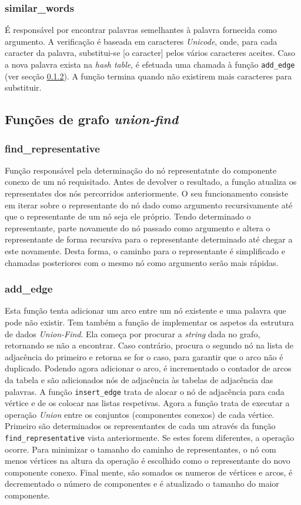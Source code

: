 \documentclass[portuguese,11pt,a4paper,titlepage]{article}
\newcommand{\foreign}[1]{\textit{#1}}
\begin{document}
\subsubsection{similar\_words}
É responsável por encontrar palavras semelhantes à palavra fornecida como argumento. A verificação é baseada em caracteres \textit{Unicode}, onde, para cada caracter da palavra, substitui-se [o caracter] pelos vários caracteres aceites. Caso a nova palavra exista na \foreign{hash table}, é efetuada uma chamada à função \verb|add_edge| (ver secção \ref{sssec:addedge}). A função termina quando não existirem mais caracteres para substituir.

\subsection{Funções de grafo \foreign{union-find}}

\subsubsection{find\_representative}
Função responsável pela determinação do nó representatnte do componente conexo de um
nó requisitado. Antes de devolver o resultado, a função atualiza os representates dos 
nós percorridos anteriormente. O seu funcionamento consiste em iterar sobre
o representante do nó dado como argumento recursivamente até que o representante de um nó seja ele próprio.
Tendo determinado o representante, parte novamente do nó passado como argumento e altera
o representante de forma recursiva para o representante determinado até chegar a este novamente. Desta forma, o caminho para o representante é simplificado e chamadas posteriores
com o mesmo nó como argumento serão mais rápidas.

\subsubsection{add\_edge}\label{sssec:addedge}
Esta função tenta adicionar um arco entre um nó existente e uma palavra que pode não
existir. Tem também a função de implementar os aspetos da estrutura de dados
\foreign{Union-Find}. Ela começa por procurar a \foreign{string} dada no grafo,
retornando se não
a encontrar. Caso contrário, procura o segundo nó na lista de adjacência do primeiro e
retorna se for o caso, para garantir que o arco não é duplicado. Podendo agora adicionar
o arco, é incrementado o contador de arcos da tabela e são adicionados nós de adjacência
às tabelas de adjacência das palavras. A função \verb|insert_edge| trata de alocar o nó
de adjacência para cada vértice e de os colocar nas listas respetivas. Agora a função
trata de executar a operação \foreign{Union} entre os conjuntos (componentes conexos)
de cada vértice. Primeiro são determinados os representantes de cada um através da função
\verb|find_representative| vista anteriormente. Se estes forem diferentes, a operação
ocorre. Para minimizar o tamanho do caminho de representantes, o nó com menos vértices
na altura da operação é escolhido como o representante do novo componente conexo. Final%
mente, são somados os numeros de vértices e arcos, é decrementado o número de componentes
e é atualizado o tamanho do maior componente.
\end{document}
